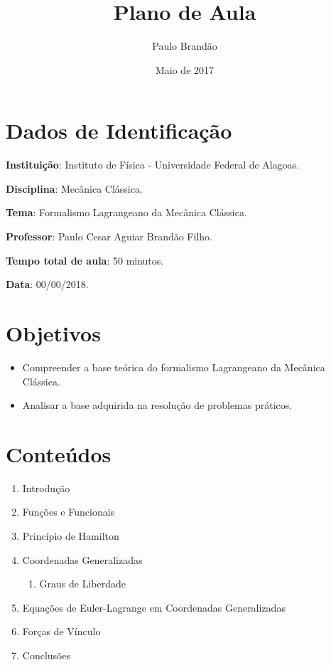 \documentclass{article}
\title{\Huge\color{astral}\textbf{Plano de Aula}}
\author{Paulo Brandão}
\date{Maio de 2017}
\begin{document}
\maketitle

\section{Dados de Identificação}

\noindent \textbf{Instituição}: Instituto de Física - Universidade Federal de Alagoas.

\noindent \textbf{Disciplina}: Mecânica Clássica.

\noindent \textbf{Tema}: Formalismo Lagrangeano da Mecânica Clássica.

\noindent \textbf{Professor}: Paulo Cesar Aguiar Brandão Filho.

\noindent \textbf{Tempo total de aula}: 50 minutos.

\noindent \textbf{Data}: 00/00/2018.

\section{Objetivos}

\begin{itemize}
    \item Compreender a base teórica do formalismo Lagrangeano da Mecânica Clássica.
    \item Analisar a base adquirida na resolução de problemas práticos.
\end{itemize}

\section{Conteúdos}

\begin{enumerate}
    \item Introdução
    \item Funções e Funcionais
    \item Princípio de Hamilton
    \item Coordenadas Generalizadas
        \begin{enumerate}
            \item Graus de Liberdade
        \end{enumerate}
    \item Equações de Euler-Lagrange em Coordenadas Generalizadas
    \item Forças de Vínculo
    \item Conclusões
\end{enumerate}
\end{document}
